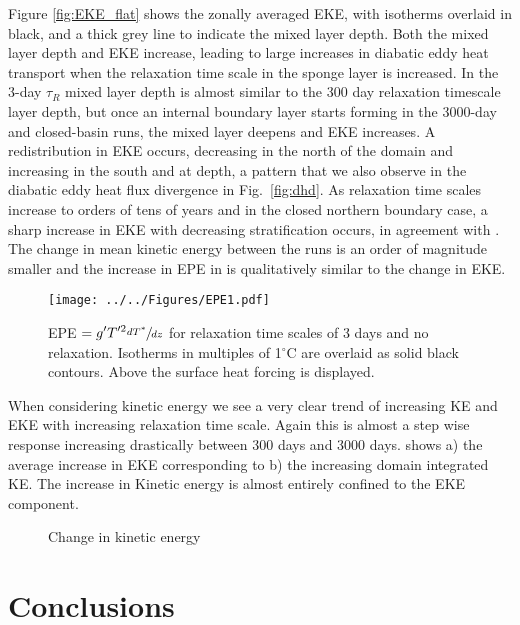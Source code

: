 Figure \ref{fig:EKE_flat} shows the zonally averaged EKE, with isotherms overlaid in black, and a thick grey line to indicate the mixed layer depth. Both the mixed layer depth and EKE increase, leading to large increases in diabatic eddy heat transport when the relaxation time scale in the sponge layer is increased. In the 3-day $\tau _R $ mixed layer depth is almost similar to the 300 day relaxation timescale layer depth, but once an internal boundary layer starts forming in the 3000-day and closed-basin runs, the mixed layer deepens and EKE increases. A redistribution in EKE occurs, decreasing in the north of the domain and increasing in the south and at depth, a pattern that we also observe in the diabatic eddy heat flux divergence in Fig.~\ref{fig:dhd}. As relaxation time scales increase to orders of tens of years and in the closed northern boundary case, a sharp increase in EKE with decreasing stratification occurs, in agreement with \cite{Gill1974a}. The change in mean kinetic energy between the runs is an order of magnitude smaller  and the increase in EPE in  is qualitatively similar to the change in EKE.  
\begin{figure}
\noindent \texttt{[image: ../../Figures/EPE1.pdf]} 
\caption{EPE $\displaystyle{= g' T ^{\prime 2} \sfrac{d T^{*} }{dz}}$ for relaxation time scales of 3 days and no relaxation. Isotherms in multiples of 1$^{\circ}$C are overlaid as solid black contours. Above the surface heat forcing is displayed. }
\label{fig:EPE_flat}
\end{figure}


When considering kinetic energy we see a very clear trend of increasing KE and EKE with increasing relaxation time scale. Again this is almost a step wise response increasing drastically between 300 days and 3000 days.  shows a) the average increase in EKE corresponding to b) the increasing domain integrated KE. The increase in Kinetic energy is almost entirely confined to the EKE component.  

\begin{figure}[H]
\center
{}
\caption{Change in kinetic energy}
\label{fig:KE_flat}
\end{figure}
\section{Conclusions}

